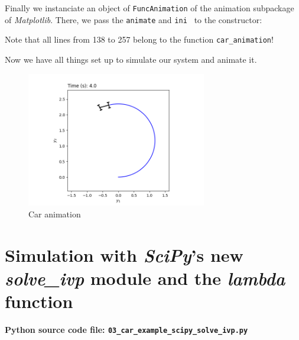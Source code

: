 \documentclass[a4paper,11pt,headings=standardclasses,parskip=half]{scrartcl}
\newcommand{\listcode}[3]{}
\newcommand{\listcodeanim}[2]{\listcode{#1}{#2}{../sim/02_car_example_animation.py}}
\newcommand{\scipy}{\emph{SciPy}\xspace}
\newcommand{\mpl}{\emph{Matplotlib}\xspace}
\begin{document}
Finally we instanciate an object of \texttt{FuncAnimation} of the animation subpackage of \mpl. There, we pass the \texttt{animate} and \texttt{ini } to the constructor:
\listcodeanim{252}{258}

Note that all lines from 138 to 257 belong to the function \texttt{car\_animation}!

Now we have all things set up to simulate our system and animate it.
\listcodeanim{274}{277}

\begin{figure}[ht]
  \centering
  \includegraphics[width=0.7\textwidth]{img/animation}
  \caption{Car animation}
  \label{fig:animation}
\end{figure}
        



\section{Simulation with \scipy's new \emph{solve\_ivp} module and the \emph{lambda} function}\label{sec:ScipyLambda}

\textbf{Python source code file: \texttt{03\_car\_example\_scipy\_solve\_ivp.py}}
\end{document}
